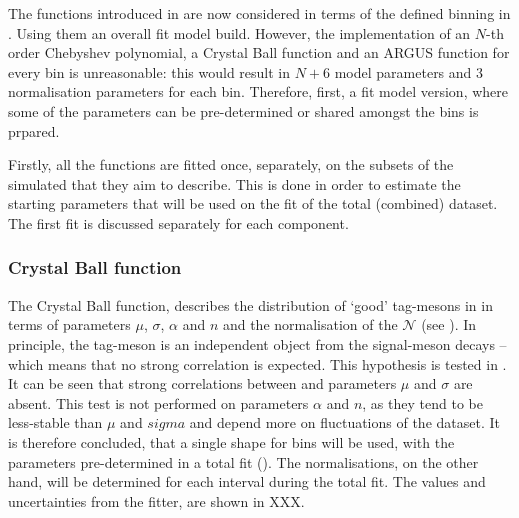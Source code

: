 The functions introduced in  are now considered in terms of the defined binning in .
Using them an overall fit model build.
However, the implementation of an $N$-th order Chebyshev polynomial, a Crystal Ball function and an ARGUS function for every \EB bin is unreasonable:
this would result in $N+6$ model parameters and 3 normalisation parameters for each bin.
Therefore, first, a fit model version, where some of the parameters can be pre-determined or shared amongst the bins is prpared.

Firstly, all the functions are fitted once, separately, on the subsets of the simulated that they aim to describe.
This is done in order to estimate the starting parameters that will be used on the fit of the total (combined) dataset.
The first fit is discussed separately for each component.


\subsubsection{Crystal Ball function}\label{sec:crystal_ball_prefit}

The Crystal Ball function, describes the distribution of `good' tag-\B mesons in \Mbc in terms of parameters $\mu$, $\sigma$, $\alpha$ and $n$ and the normalisation of the \PDF $\mathcal{N}$ (see ).
In principle, the tag-\B meson is an independent object from the signal-\B meson decays -- which means that no strong \EB correlation is expected.
This hypothesis is tested in .
It can be seen that strong correlations between \EB and parameters $\mu$ and $\sigma$ are absent.
This test is not performed on parameters $\alpha$ and $n$, as they tend to be less-stable than $\mu$ and $sigma$ and depend more on fluctuations of the dataset.
It is therefore concluded, that a single \Mbc shape for \EB bins will be used, with the parameters pre-determined in a total fit ().
The normalisations, on the other hand, will be determined for each \EB interval during the total fit.
The values and uncertainties from the fitter, are shown in XXX.

